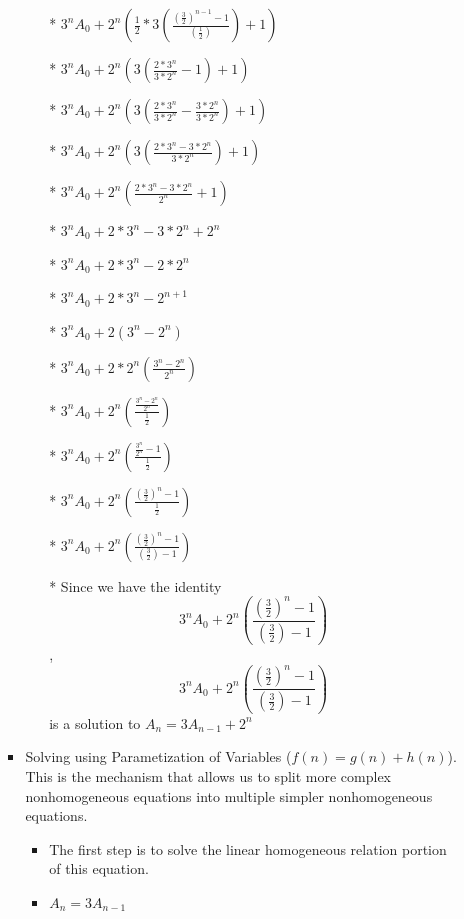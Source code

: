 \begin{enumerate}
\begin{enumerate}
\begin{itemize}
\begin{itemize}
      \item [*] $3^{n}A_{0} + 2^{n} \left(\frac{1}{2}*3\left(\frac{(\frac{3}{2})^{n-1}-1}{(\frac{1}{2})}\right)+1\right)$
      \item [*] $3^{n}A_{0} + 2^{n} \left(3\left(\frac{2*3^{n}}{3*2^{n}}-1\right)+1\right)$
      \item [*] $3^{n}A_{0} + 2^{n} \left(3\left(\frac{2*3^{n}}{3*2^{n}}-\frac{3*2^{n}}{3*2^{n}}\right)+1\right)$
      \item [*] $3^{n}A_{0} + 2^{n} \left(3\left(\frac{2*3^{n}-3*2^{n}}{3*2^{n}}\right)+1\right)$
      \item [*] $3^{n}A_{0} + 2^{n} \left(\frac{2*3^{n}-3*2^{n}}{2^{n}}+1\right)$
      \item [*] $3^{n}A_{0} + 2*3^{n}-3*2^{n}+2^{n}$
      \item [*] $3^{n}A_{0} + 2*3^{n}-2*2^{n}$
      \item [*] $3^{n}A_{0} + 2*3^{n}-2^{n+1}$
      \item [*] $3^{n}A_{0} + 2(3^{n}-2^{n})$
      \item [*] $3^{n}A_{0} + 2*2^{n}\left(\frac{3^{n}-2^{n}}{2^{n}}\right)$
      \item [*] $3^{n}A_{0} + 2^{n}\left(\frac{\frac{3^{n}-2^{n}}{2^{n} }}{\frac{1}{2}}\right)$
      \item [*] $3^{n}A_{0} + 2^{n}\left(\frac{\frac{3^{n}}{2^{n}}-1}{\frac{1}{2}}\right)$
      \item [*] $3^{n}A_{0} + 2^{n}\left(\frac{\left(\frac{3}{2}\right)^{n}-1}{\frac{1}{2}}\right)$
      \item [*] $3^{n}A_{0} + 2^{n}\left(\frac{\left(\frac{3}{2}\right)^{n}-1}{\left(\frac{3}{2}\right)-1}\right)$
      \item [*] Since we have the identity $$3^{n}A_{0} + 2^{n}\left(\frac{\left(\frac{3}{2}\right)^{n}-1}{\left(\frac{3}{2}\right)-1}\right)$$, $$3^{n}A_{0} + 2^{n}\left(\frac{\left(\frac{3}{2}\right)^{n}-1}{\left(\frac{3}{2}\right)-1}\right)$$ is a solution to $A_{n}=3A_{n-1}+2^{n}$
      \end{itemize} %
    \item Solving using Parametization of Variables ($f(n)=g(n)+h(n)$). This is the mechanism that allows us to split more complex nonhomogeneous equations into multiple simpler nonhomogeneous equations.
      \begin{itemize} %
      \item The first step is to solve the linear homogeneous relation portion of this equation.
      \item $A_{n}=3A_{n-1}$

\end{itemize}
\end{itemize}
\end{enumerate}
\end{enumerate}
